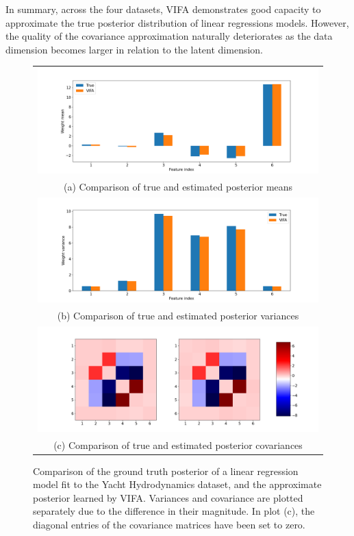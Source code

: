 \documentclass[msc,deptreport.inf]{infthesis} %
\begin{document}
In summary,  across the four datasets, VIFA demonstrates good capacity to approximate the true posterior distribution of linear regressions models. However, the quality of the covariance approximation naturally deteriorates as the data dimension becomes larger in relation to the latent dimension.

\begin{figure}[!htbp] 
	\begin{tabular}{c}
		\includegraphics[width=140mm]{plots/yacht_hydrodynamics_posterior_mean.png} \\
		(a) Comparison of true and estimated posterior means \\[6pt] 
		 \includegraphics[width=140mm]{plots/yacht_hydrodynamics_posterior_variance.png} \\
		(b) Comparison of true and estimated posterior variances \\[6pt] 
		\includegraphics[width=140mm]{plots/yacht_hydrodynamics_posterior_covariance.png} \\
		(c) Comparison of true and estimated posterior covariances \\[6pt] 
	\end{tabular}
	\caption{Comparison of the ground truth posterior of a linear regression model fit to the Yacht Hydrodynamics dataset, and the approximate posterior learned by VIFA. Variances and covariance are plotted separately due to the difference in their magnitude. In plot (c), the diagonal entries of the covariance matrices have been set to zero.}
	\label{fig:posterior_yacht_hydrodynamics}
\end{figure}
\end{document}
